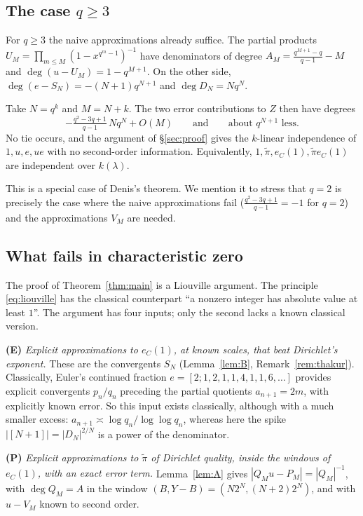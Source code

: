 \documentclass[11pt]{amsart}
\theoremstyle{remark}
\numberwithin{equation}{section}
\newcommand{\pit}{\tilde\pi}
\newcommand{\eC}{e_C}
\begin{document}
\subsection{The case \texorpdfstring{$q\ge3$}{q>=3}}\label{subsec:qge3}
For $q\ge3$ the naive approximations already suffice. The partial products $U_M=\prod_{m\le M}(1-x^{q^m-1})^{-1}$ have denominators of degree $A_M=\frac{q^{M+1}-q}{q-1}-M$ and $\deg(u-U_M)=1-q^{M+1}$. On the other side, $\deg(e-S_N)=-(N+1)q^{N+1}$ and $\deg D_N=Nq^N$.

Take $N=q^k$ and $M=N+k$. The two error contributions to $Z$ then have degrees
\[
-\tfrac{q^2-3q+1}{q-1}\,Nq^N+O(M)\qquad\text{and}\qquad\text{about } q^{N+1} \text{ less}.
\]
No tie occurs, and the argument of \S\ref{sec:proof} gives the $k$-linear independence of $1,u,e,ue$ with no second-order information. Equivalently, $1,\pit,\eC(1),\pit\eC(1)$ are independent over $k(\lambda)$.

This is a special case of Denis's theorem. We mention it to stress that $q=2$ is precisely the case where the naive approximations fail ($\frac{q^2-3q+1}{q-1}=-1$ for $q=2$) and the approximations $V_M$ are needed.

\subsection{What fails in characteristic zero}\label{subsec:char0}
The proof of Theorem~\ref{thm:main} is a Liouville argument. The principle \eqref{eq:liouville} has the classical counterpart ``a nonzero integer has absolute value at least $1$''. The argument has four inputs; only the second lacks a known classical version.

\smallskip\noindent\textbf{(E)} \emph{Explicit approximations to $\eC(1)$, at known scales, that beat Dirichlet's exponent.} These are the convergents $S_N$ (Lemma~\ref{lem:B}, Remark~\ref{rem:thakur}). Classically, Euler's continued fraction $e=[2;1,2,1,1,4,1,1,6,\dots]$ provides explicit convergents $p_n/q_n$ preceding the partial quotients $a_{n+1}=2m$, with explicitly known error. So this input exists classically, although with a much smaller excess: $a_{n+1}\asymp\log q_n/\log\log q_n$, whereas here the spike $|[N+1]|=|D_N|^{2/N}$ is a power of the denominator.

\smallskip\noindent\textbf{(P)} \emph{Explicit approximations to $\pit$ of Dirichlet quality, inside the windows of $\eC(1)$, with an exact error term.} Lemma~\ref{lem:A} gives $|Q_Mu-P_M|=|Q_M|^{-1}$, with $\deg Q_M=A$ in the window $(B,Y-B)=(N2^N,(N+2)2^N)$, and with $u-V_M$ known to second order.
\end{document}
